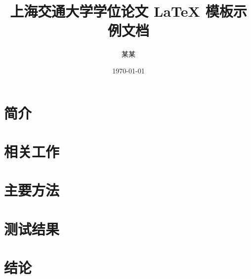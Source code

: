 \documentclass{sjtuarticle}
\title{上海交通大学学位论文 \LaTeX{} 模板示例文档}
\author{某\quad{}某}
\date{\today}
\begin{document}
\begin{abstract}
  
\end{abstract}

\tableofcontents

\section{简介}

\zhlipsum[1]

\section{相关工作}

\zhlipsum[2]

\section{主要方法}

\zhlipsum[3]

\section{测试结果}

\zhlipsum[4]

\section{结论}

\zhlipsum[5]

\nocite{*}
\printbibliography[heading=bibintoc]
\end{document}

